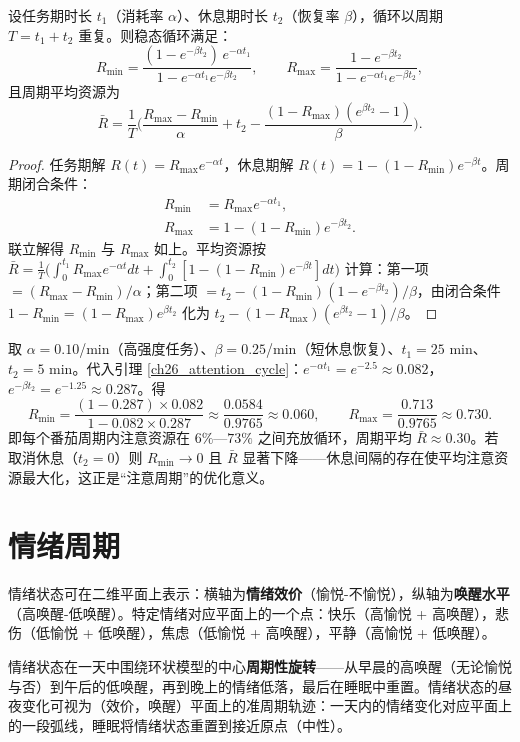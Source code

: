 \begin{lemma}[注意充放电循环的闭合解]\label{ch26_attention_cycle}
设任务期时长 $t_1$（消耗率 $\alpha$）、休息期时长 $t_2$（恢复率 $\beta$），循环以周期 $T = t_1 + t_2$ 重复。则稳态循环满足：
\[
R_{\min} = \frac{(1 - e^{-\beta t_2})\, e^{-\alpha t_1}}{1 - e^{-\alpha t_1} e^{-\beta t_2}}, \qquad
R_{\max} = \frac{1 - e^{-\beta t_2}}{1 - e^{-\alpha t_1} e^{-\beta t_2}},
\]
且周期平均资源为
\[
\bar R = \frac{1}{T}\Big( \frac{R_{\max} - R_{\min}}{\alpha} + t_2 - \frac{(1 - R_{\max})(e^{\beta t_2} - 1)}{\beta} \Big).
\]
\end{lemma}

\begin{proof}
任务期解 $R(t) = R_{\max} e^{-\alpha t}$，休息期解 $R(t) = 1 - (1 - R_{\min}) e^{-\beta t}$。周期闭合条件：
\[
\begin{aligned}
R_{\min} &= R_{\max} e^{-\alpha t_1}, \\
R_{\max} &= 1 - (1 - R_{\min}) e^{-\beta t_2}.
\end{aligned}
\]
联立解得 $R_{\min}$ 与 $R_{\max}$ 如上。平均资源按 $\bar R = \frac{1}{T}\big(\int_0^{t_1} R_{\max}e^{-\alpha t} dt + \int_0^{t_2} [1-(1-R_{\min})e^{-\beta t}] dt\big)$ 计算：第一项 $= (R_{\max}-R_{\min})/\alpha$；第二项 $= t_2 - (1-R_{\min})(1-e^{-\beta t_2})/\beta$，由闭合条件 $1 - R_{\min} = (1-R_{\max}) e^{\beta t_2}$ 化为 $t_2 - (1-R_{\max})(e^{\beta t_2}-1)/\beta$。
\end{proof}

\begin{example}[番茄工作法的注意周期]\label{ch26_pomodoro_example}
取 $\alpha = 0.10$/min（高强度任务）、$\beta = 0.25$/min（短休息恢复）、$t_1 = 25$ min、$t_2 = 5$ min。代入引理 \ref{ch26_attention_cycle}：$e^{-\alpha t_1} = e^{-2.5} \approx 0.082$，$e^{-\beta t_2} = e^{-1.25} \approx 0.287$。得
\[
R_{\min} = \frac{(1-0.287)\times 0.082}{1 - 0.082\times 0.287} \approx \frac{0.0584}{0.9765} \approx 0.060, \qquad
R_{\max} = \frac{0.713}{0.9765} \approx 0.730.
\]
即每个番茄周期内注意资源在 $6\%$—$73\%$ 之间充放循环，周期平均 $\bar R \approx 0.30$。若取消休息（$t_2 = 0$）则 $R_{\min} \to 0$ 且 $\bar R$ 显著下降——休息间隔的存在使平均注意资源最大化，这正是“注意周期”的优化意义。
\end{example}

\section{情绪周期}

\begin{definition}[情绪的环状模型]\label{def:emotion_circumplex}
情绪状态可在二维平面上表示：横轴为\textbf{情绪效价}（愉悦-不愉悦），纵轴为\textbf{唤醒水平}（高唤醒-低唤醒）。特定情绪对应平面上的一个点：快乐（高愉悦 + 高唤醒），悲伤（低愉悦 + 低唤醒），焦虑（低愉悦 + 高唤醒），平静（高愉悦 + 低唤醒）。

情绪状态在一天中围绕环状模型的中心\textbf{周期性旋转}——从早晨的高唤醒（无论愉悦与否）到午后的低唤醒，再到晚上的情绪低落，最后在睡眠中重置。情绪状态的昼夜变化可视为（效价，唤醒）平面上的准周期轨迹：一天内的情绪变化对应平面上的一段弧线，睡眠将情绪状态重置到接近原点（中性）。
\end{definition}

